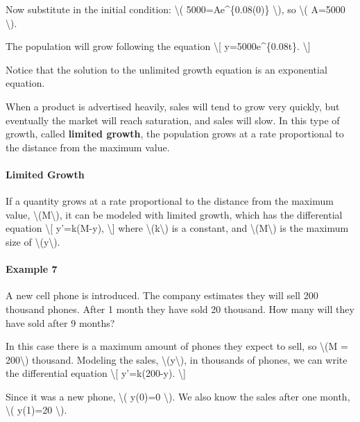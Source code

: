 Now substitute in the initial condition: \textbackslash{}(
5000=Ae\^{}\{0.08(0)\} \textbackslash{}), so \textbackslash{}( A=5000
\textbackslash{}).

The population will grow following the equation \textbackslash{}{[}
y=5000e\^{}\{0.08t\}. \textbackslash{}{]}

Notice that the solution to the unlimited growth equation is an
exponential equation.

When a product is advertised heavily, sales will tend to grow very
quickly, but eventually the market will reach saturation, and sales will
slow. In this type of growth, called \textbf{limited growth}, the
population grows at a rate proportional to the distance from the maximum
value.

\hypertarget{limited-growth}{%
\paragraph{Limited Growth}\label{limited-growth}}

If a quantity grows at a rate proportional to the distance from the
maximum value, \textbackslash{}(M\textbackslash{}), it can be modeled
with limited growth, which has the differential equation
\textbackslash{}{[} y'=k(M-y), \textbackslash{}{]} where
\textbackslash{}(k\textbackslash{}) is a constant, and
\textbackslash{}(M\textbackslash{}) is the maximum size of
\textbackslash{}(y\textbackslash{}).

\hypertarget{example-7}{%
\paragraph{Example 7}\label{example-7}}

A new cell phone is introduced. The company estimates they will sell 200
thousand phones. After 1 month they have sold 20 thousand. How many will
they have sold after 9 months?

In this case there is a maximum amount of phones they expect to sell, so
\textbackslash{}(M = 200\textbackslash{}) thousand. Modeling the sales,
\textbackslash{}(y\textbackslash{}), in thousands of phones, we can
write the differential equation \textbackslash{}{[} y'=k(200-y).
\textbackslash{}{]}

Since it was a new phone, \textbackslash{}( y(0)=0 \textbackslash{}). We
also know the sales after one month, \textbackslash{}( y(1)=20
\textbackslash{}).

